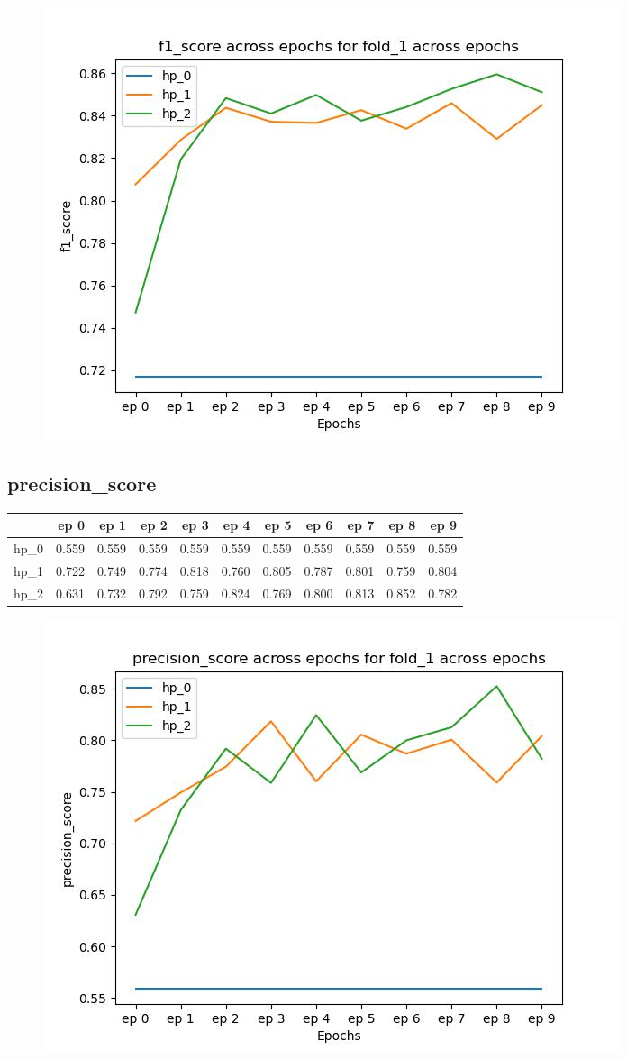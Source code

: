 \documentclass{article}
\begin{document}
\begin{figure}[H]
\includegraphics[scale = 0.75]{fold_1/f1_score}
\end{figure}
\subsection{precision\_score}
\begin{tabular}{lrrrrrrrrrr}
\toprule
{} &   ep 0 &   ep 1 &   ep 2 &   ep 3 &   ep 4 &   ep 5 &   ep 6 &   ep 7 &   ep 8 &   ep 9 \\
\midrule
hp\_0 &  0.559 &  0.559 &  0.559 &  0.559 &  0.559 &  0.559 &  0.559 &  0.559 &  0.559 &  0.559 \\
hp\_1 &  0.722 &  0.749 &  0.774 &  0.818 &  0.760 &  0.805 &  0.787 &  0.801 &  0.759 &  0.804 \\
hp\_2 &  0.631 &  0.732 &  0.792 &  0.759 &  0.824 &  0.769 &  0.800 &  0.813 &  0.852 &  0.782 \\
\bottomrule
\end{tabular}

\begin{figure}[H]
\includegraphics[scale = 0.75]{fold_1/precision_score}
\end{figure}
\end{document}

